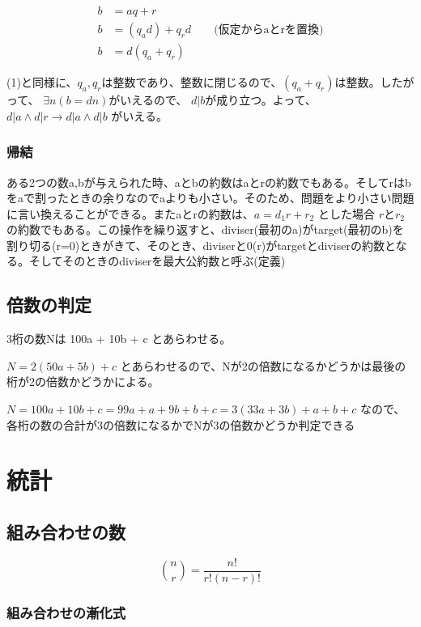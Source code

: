 \documentclass[dvipdfmx]{jsarticle}
\begin{document}
\begin{align*}
  b &= aq + r \\
  b &= (q_ad) + q_rd \qquad \text{(仮定からaとrを置換)} \\
  b &= d(q_a + q_r)
\end{align*}

(1)と同様に、$q_a, q_r$は整数であり、整数に閉じるので、$(q_a + q_r)$は整数。したがって、 $\exists n ( b = dn)$がいえるので、 $d | b$が成り立つ。よって、 $d | a \land d | r \rightarrow d | a \land d | b$ がいえる。

\subsubsection{帰結}
ある2つの数a,bが与えられた時、aとbの約数はaとrの約数でもある。そしてrはbをaで割ったときの余りなのでaよりも小さい。そのため、問題をより小さい問題に言い換えることができる。またaとrの約数は、$a = d_1r + r_2$ とした場合 $rとr_2$の約数でもある。この操作を繰り返すと、diviser(最初のa)がtarget(最初のb)を割り切る(r=0)ときがきて、そのとき、diviserと0(r)がtargetとdiviserの約数となる。そしてそのときのdiviserを最大公約数と呼ぶ(定義)

\subsection{倍数の判定}

3桁の数Nは 100a + 10b + c とあらわせる。

$ N = 2(50a + 5b) + c$ とあらわせるので、Nが2の倍数になるかどうかは最後の桁が2の倍数かどうかによる。

$ N = 100a + 10b + c = 99a + a + 9b + b + c = 3(33a + 3b) + a + b + c$ なので、各桁の数の合計が3の倍数になるかでNが3の倍数かどうか判定できる

\section{統計}

\subsection{組み合わせの数}

\[ \binom nr = \frac{n!}{r!(n-r)!} \]


\subsubsection{組み合わせの漸化式}
\end{document}
